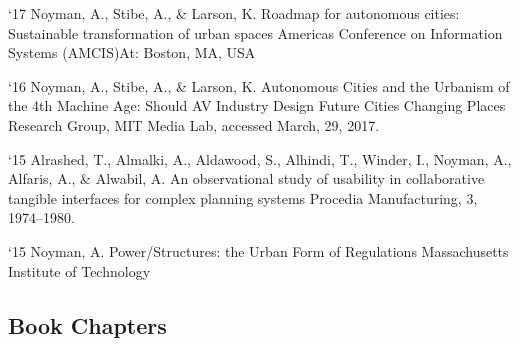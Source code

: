 \begin{tablist}
    \item[`17] \tab  Noyman, A., Stibe, A., \& Larson, K.
    Roadmap for autonomous cities: Sustainable transformation of urban spaces
    Americas Conference on Information Systems (AMCIS)At: Boston, MA, USA

    \item[`16] \tab  Noyman, A., Stibe, A., \& Larson, K.
    Autonomous Cities and the Urbanism of the 4th Machine Age: Should AV Industry Design Future Cities
    Changing Places Research Group, MIT Media Lab, accessed March, 29, 2017.

    \item[`15] \tab  Alrashed, T., Almalki, A., Aldawood, S., Alhindi, T., Winder, I., Noyman, A., Alfaris, A., \& Alwabil, A.
    An observational study of usability in collaborative tangible interfaces for complex planning systems
    Procedia Manufacturing, 3, 1974–1980.

    \item[`15] \tab  Noyman, A.
    Power/Structures: the Urban Form of Regulations
    Massachusetts Institute of Technology

\end{tablist}


\subsection*{Book Chapters}

